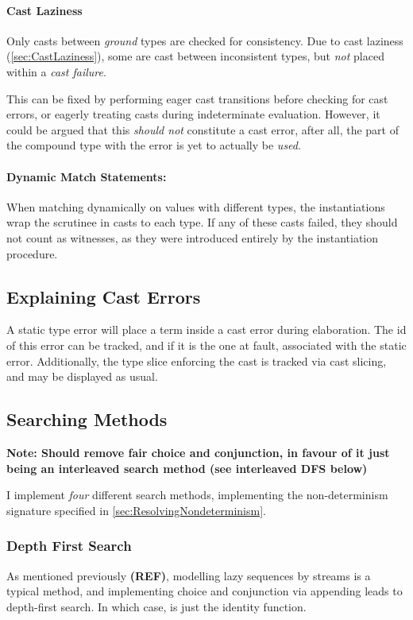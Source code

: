 \paragraph{Cast Laziness}
\label{sec:SearchCastLaziness}
Only casts between \textit{ground} types are checked for consistency. Due to cast laziness (\cref{sec:CastLaziness}), some are cast between inconsistent types, but \textit{not} placed within a \textit{cast failure}.

This can be fixed by performing eager cast transitions before checking for cast errors, or eagerly treating casts during indeterminate evaluation. However, it could be argued that this \textit{should not} constitute a cast error, after all, the part of the compound type with the error is yet to actually be \textit{used}.

\paragraph{Dynamic Match Statements:} When matching dynamically on values with different types, the instantiations wrap the scrutinee in casts to each type. If any of these casts failed, they should not count as witnesses, as they were introduced entirely by the instantiation procedure. 

\subsection{Explaining Cast Errors}
\label{sec:StaticCastError}
A static type error will place a term inside a cast error during elaboration. The id of this error can be tracked, and if it is the one at fault, associated with the static error. Additionally, the type slice enforcing the cast is tracked via cast slicing, and may be displayed as usual.

\subsection{Searching Methods}\label{sec:SearchMethods}
\textbf{Note: Should remove fair choice and conjunction, in favour of it just being an interleaved search method (see interleaved DFS below)}

I implement \textit{four} different search methods, implementing the non-determinism signature specified in \cref{sec:ResolvingNondeterminism}.

\subsubsection{Depth First Search}
As mentioned previously \textbf{(REF)}, modelling lazy sequences by streams is a typical method, and implementing choice and conjunction via appending leads to depth-first search. In which case,  is just the identity function.

